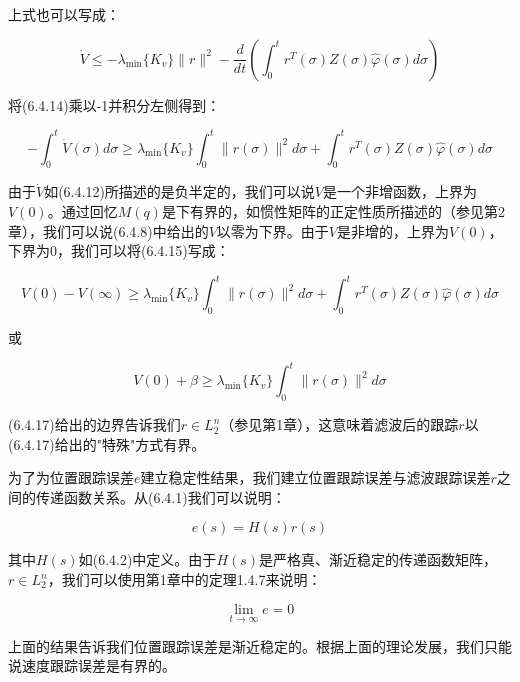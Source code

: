 \documentclass[12pt,a4paper]{ctexart}
\begin{document}
上式也可以写成：

\begin{equation}
\dot{V} \leq -\lambda_{\min}\{K_v\}\|r\|^2 - \frac{d}{dt}\left(\int_0^t r^T(\sigma)Z(\sigma)\hat{\varphi}(\sigma)d\sigma\right)
\end{equation}

将(6.4.14)乘以-1并积分左侧得到：

\begin{equation}
-\int_0^t \dot{V}(\sigma)d\sigma \geq \lambda_{\min}\{K_v\}\int_0^t \|r(\sigma)\|^2 d\sigma + \int_0^t r^T(\sigma)Z(\sigma)\hat{\varphi}(\sigma)d\sigma
\end{equation}

由于$\dot{V}$如(6.4.12)所描述的是负半定的，我们可以说$V$是一个非增函数，上界为$V(0)$。通过回忆$M(q)$是下有界的，如惯性矩阵的正定性质所描述的（参见第2章），我们可以说(6.4.8)中给出的$V$以零为下界。由于$V$是非增的，上界为$V(0)$，下界为$0$，我们可以将(6.4.15)写成：

\begin{equation}
V(0) - V(\infty) \geq \lambda_{\min}\{K_v\}\int_0^t \|r(\sigma)\|^2 d\sigma + \int_0^t r^T(\sigma)Z(\sigma)\hat{\varphi}(\sigma)d\sigma
\end{equation}

或

\begin{equation}
V(0) + \beta \geq \lambda_{\min}\{K_v\}\int_0^t \|r(\sigma)\|^2 d\sigma
\end{equation}

(6.4.17)给出的边界告诉我们$r \in L_2^{n}$（参见第1章），这意味着滤波后的跟踪$r$以(6.4.17)给出的"特殊"方式有界。

为了为位置跟踪误差$e$建立稳定性结果，我们建立位置跟踪误差与滤波跟踪误差$r$之间的传递函数关系。从(6.4.1)我们可以说明：

\begin{equation}\label{eq:transfer-e-r}
e(s) = H(s)r(s)
\end{equation}

其中$H(s)$如(6.4.2)中定义。由于$H(s)$是严格真、渐近稳定的传递函数矩阵，$r \in L_2^{n}$，我们可以使用第1章中的定理1.4.7来说明：

\begin{equation}\label{eq:e-converge}
\lim_{t \to \infty} e = 0
\end{equation}

上面的结果告诉我们位置跟踪误差是渐近稳定的。根据上面的理论发展，我们只能说速度跟踪误差是有界的。
\end{document}
